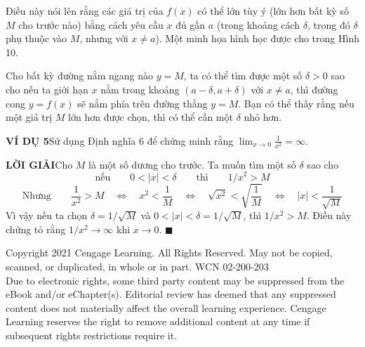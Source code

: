 \begin{minipage}[t]{0.72\textwidth}
    Điều này nói lên rằng các giá trị của $f(x)$ có thể lớn tùy ý (lớn hơn bất kỳ số $M$ cho trước nào) bằng cách yêu cầu $x$ đủ gần $a$ (trong khoảng cách $\delta$, trong đó $\delta$ phụ thuộc vào $M$, nhưng với $x \neq a$). Một minh họa hình học được cho trong Hình 10.

    Cho bất kỳ đường nằm ngang nào $y = M$, ta có thể tìm được một số $\delta > 0$ sao cho nếu ta giới hạn $x$ nằm trong khoảng $(a - \delta, a + \delta)$ với $x \neq a$, thì đường cong $y = f(x)$ sẽ nằm phía trên đường thẳng $y = M$. Bạn có thể thấy rằng nếu một giá trị $M$ lớn hơn được chọn, thì có thể cần một $\delta$ nhỏ hơn.

    \vspace{0.8em}
    \noindent\textbf{\textsf{\color{stewartcyan}VÍ DỤ 5}}\quad Sử dụng Định nghĩa 6 để chứng minh rằng $\displaystyle\lim_{x \to 0} \frac{1}{x^2} = \infty$.

    \vspace{0.3em}
    \noindent\textbf{\textsf{\color{stewartcyan}LỜI GIẢI}}\quad Cho $M$ là một số dương cho trước. Ta muốn tìm một số $\delta$ sao cho
    \[
    \text{nếu}\qquad 0 < |x| < \delta \qquad\text{thì}\qquad 1/x^2 > M
    \]
    \[
    \text{Nhưng}\qquad \frac{1}{x^2} > M \quad\iff\quad x^2 < \frac{1}{M} \quad\iff\quad \sqrt{x^2} < \sqrt{\frac{1}{M}} \quad\iff\quad |x| < \frac{1}{\sqrt{M}}
    \]
    Vì vậy nếu ta chọn $\delta = 1/\sqrt{M}$ và $0 < |x| < \delta = 1/\sqrt{M}$, thì $1/x^2 > M$. Điều này chứng tỏ rằng $1/x^2 \to \infty$ khi $x \to 0$. \hfill {\color{stewartcyan}$\blacksquare$}
\end{minipage}

\vfill
\begin{center}
    \fontsize{6.5}{8}\selectfont \color{stewartgray}
    Copyright 2021 Cengage Learning. All Rights Reserved. May not be copied, scanned, or duplicated, in whole or in part. WCN 02-200-203\\
    Due to electronic rights, some third party content may be suppressed from the eBook and/or eChapter(s). Editorial review has deemed that any suppressed content does not materially affect the overall learning experience. Cengage Learning reserves the right to remove additional content at any time if subsequent rights restrictions require it.
\end{center}
